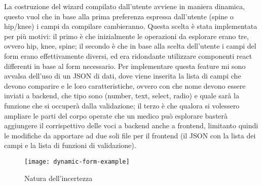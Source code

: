 La costruzione del wizard compilato dall'utente avviene in maniera dinamica, questo vuol che in base alla prima preferenza espressa dall'utente (spine o hip/knee) i campi da compilare cambieranno. Questa scelta è stata implementata per più motivi: il primo è che inizialmente le operazioni da esplorare erano tre, ovvero hip, knee, spine; il secondo è che in base alla scelta dell'utente i campi del form erano effettivamente diversi, ed era ridondante utilizzare componenti react differenti in base al form necessario. Per implementare questa feature mi sono avvalsa dell'uso di un JSON di dati, dove viene inserita la lista di campi che devono comparire e le loro caratteristiche, ovvero con che nome devono essere inviati a backend, che tipo sono (number, text, select, radio) e quale sarà la funzione che si occuperà dalla validazione; il terzo è che qualora si volessero ampliare le parti del corpo operate che un medico può esplorare basterà aggiungere il corrispettivo delle voci a backend anche a frontend, limitanto quindi le modifiche da apportare ad due soli file per il frontend (il JSON con la lista dei campi e la lista di funzioni di validazione). 

\begin{figure}[!ht] 
    \centering 
    \texttt{[image: dynamic-form-example]} 
    \caption{Natura dell'incertezza}
\end{figure}
